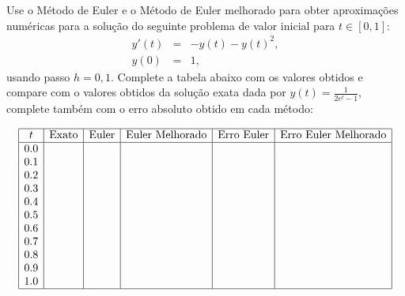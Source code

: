 \begin{Exercise}Use o Método de Euler e o Método de Euler melhorado para obter aproximações numéricas para a solução do seguinte problema de valor inicial para $t\in[0,1]$:
\begin{eqnarray*}
 y'(t)&=&-y(t)- y(t)^2,\\
 y(0)&=&1,
\end{eqnarray*}
usando passo $h=0,1$. Complete a tabela abaixo com os valores obtidos e compare com o valores obtidos da solução exata dada por $y(t)=\frac{1}{2e^t-1}$, complete também com o erro absoluto obtido em cada método:
\begin{tiny}  
 $$\begin{array}{|c|c|c|c|c|c|}
\hline
t &  \hbox{Exato} & \hbox{Euler} & \hbox{Euler Melhorado} & \hbox{Erro Euler} & \hbox{Erro Euler Melhorado}\\
\hline
0.0 &  &  & &&\\
0.1 &  &  & &&\\
0.2 &  &  & &&\\
0.3 &  &  & &&\\
0.4 &  &  & &&\\
0.5 &  &  & &&\\
0.6 &  &  & &&\\
0.7 &  &  & &&\\
0.8 &  &  & &&\\
0.9 &  &  & &&\\
1.0 &  &  & &&\\
\hline
\end{array}
$$
\end{tiny}
\end{Exercise}
